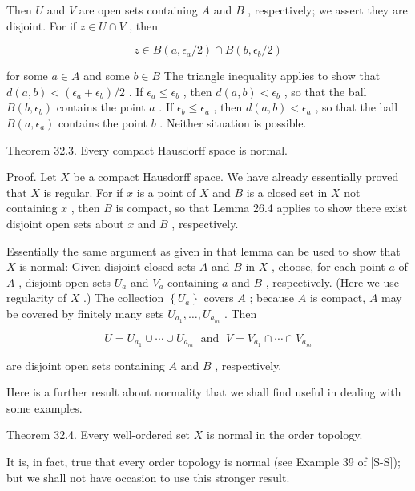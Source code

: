 \documentclass[10pt]{article}
\begin{document}
Then \(U\) and \(V\) are open sets containing \(A\) and \(B\) , respectively; we assert they are disjoint. For if \(z \in  U \cap  V\) , then

\[
z \in  B\left( {a,{\epsilon }_{a}/2}\right)  \cap  B\left( {b,{\epsilon }_{b}/2}\right)
\]

for some \(a \in  A\) and some \(b \in  B\) The triangle inequality applies to show that \(d\left( {a,b}\right)  < \left( {{\epsilon }_{a} + {\epsilon }_{b}}\right) /2\) . If \({\epsilon }_{a} \leq  {\epsilon }_{b}\) , then \(d\left( {a,b}\right)  < {\epsilon }_{b}\) , so that the ball \(B\left( {b,{\epsilon }_{b}}\right)\) contains the point \(a\) . If \({\epsilon }_{b} \leq  {\epsilon }_{a}\) , then \(d\left( {a,b}\right)  < {\epsilon }_{a}\) , so that the ball \(B\left( {a,{\epsilon }_{a}}\right)\) contains the point \(b\) . Neither situation is possible.

Theorem 32.3. Every compact Hausdorff space is normal.

Proof. Let \(X\) be a compact Hausdorff space. We have already essentially proved that \(X\) is regular. For if \(x\) is a point of \(X\) and \(B\) is a closed set in \(X\) not containing \(x\) , then \(B\) is compact, so that Lemma 26.4 applies to show there exist disjoint open sets about \(x\) and \(B\) , respectively.

Essentially the same argument as given in that lemma can be used to show that \(X\) is normal: Given disjoint closed sets \(A\) and \(B\) in \(X\) , choose, for each point \(a\) of \(A\) , disjoint open sets \({U}_{a}\) and \({V}_{a}\) containing \(a\) and \(B\) , respectively. (Here we use regularity of \(X\) .) The collection \(\left\{  {U}_{a}\right\}\) covers \(A\) ; because \(A\) is compact, \(A\) may be covered by finitely many sets \({U}_{{a}_{1}},\ldots ,{U}_{{a}_{m}}\) . Then

\[
U = {U}_{{a}_{1}} \cup  \cdots  \cup  {U}_{{a}_{m}}\;\text{ and }\;V = {V}_{{a}_{1}} \cap  \cdots  \cap  {V}_{{a}_{m}}
\]

are disjoint open sets containing \(A\) and \(B\) , respectively.

Here is a further result about normality that we shall find useful in dealing with some examples.

Theorem 32.4. Every well-ordered set \(X\) is normal in the order topology.

It is, in fact, true that every order topology is normal (see Example 39 of [S-S]); but we shall not have occasion to use this stronger result.
\end{document}
